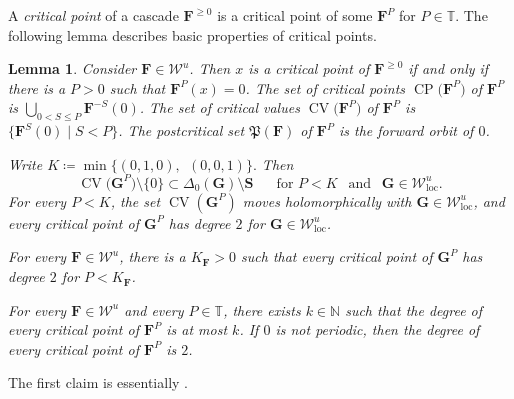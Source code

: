 \documentclass{amsart}
\renewcommand{\sp}{{\ \ }}
\newcommand{\1}{{\mathbb 1 }}
\newcommand\PT{\mathbb{ T}}
\newcommand{\bDelta}{{\mathbb{\Delta}}}
\newcommand\Post{{\mathfrak P}}
\newcommand{\bF}{{\mathbf F}}
\newcommand{\bS}{{\mathbf S}}
\newcommand{\bG}{{\mathbf G}}
\def\loc{{\mathrm{loc}}}
\newcommand\Unst{{\boldsymbol{\mathcal{W}}^u}}
\newcommand\UnstLoc{{\boldsymbol{\mathcal{W}}^u_\loc}}
\newcommand{\N}{\mathbb{N}}
\newtheorem{lem}[thm]{Lemma}
\theoremstyle{remark}
\numberwithin{equation}{section}
\theoremstyle{definition}
\newcommand{\CV}{{\operatorname{CV}}}
\newcommand{\CP}{{\operatorname{CP}}}
\theoremstyle{nonumberbreak}
\begin{document}
 A \emph{critical point} of a cascade $\bF^{\ge0}$ is a critical point of some $\bF^P$ for $P\in \PT$. The following lemma describes basic properties of critical points. 
\begin{lem}
\label{lem:crit pts}
Consider $\bF\in \Unst$. Then $x$ is a critical point of $\bF^{\ge 0}$ if and only if
 there is a $P>0$ such that $\bF^P(x)=0$. The set of critical points  $\CP\big(\bF^P\big)$ of $\bF^P$ is $\bigcup_{0<S\le P } \bF^{-S}(0)$. The set of critical values $\CV\big(\bF^P\big)$ of $\bF^P$ is $\{  \bF^{S}(0)\mid S< P\}$. The postcritical set $\Post(\bF)$ of $\bF^P$ is the forward orbit of $0$. 


Write $K\coloneqq \min\{(0,1,0),\sp (0,0,1)\}.$ Then
 \begin{equation}
\label{eq:CV are away from 0}
\CV\big(\bG^P\big)\setminus \{0\}\subset \bDelta_0(\bG)\setminus \bS\sp \sp \sp \text{ for } P< K \sp \text{ and }\sp \bG\in \UnstLoc.
\end{equation}
For every $P<K$, the set $\CV(\bG^P)$ moves holomorphically with $\bG\in \UnstLoc$, and every critical point of $\bG^P$ has degree $2$ for  $\bG\in \UnstLoc$. 


For every $\bF\in \Unst$, there is a $K_{\bF}>0$ such that every critical point of $\bG^P$ has degree $2$ for $P < K_{\bF}$.  

For every $\bF\in \Unst$ and every $P\in \PT$, there exists $k\in  \N$ such that the degree of every critical point of $\bF^P$ is at most $k$. If $0$ is not periodic, then the degree of every critical point of $\bF^P$ is $2$.
\end{lem} 
\noindent The first claim is essentially  \cite[Lemma~6.1]{DLS}.
\end{document}
